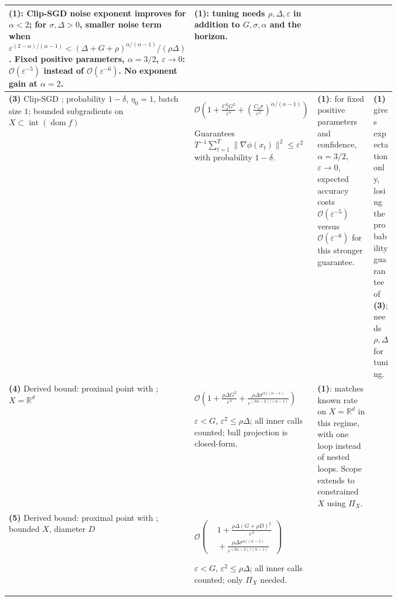 \begin{table}[tp]
\begin{threeparttable}
\begin{tabularx}{\linewidth}{@{}>{\raggedright\arraybackslash}p{0.20\linewidth}>{\raggedright\arraybackslash}p{0.32\linewidth}>{\raggedright\arraybackslash}p{0.25\linewidth}>{\raggedright\arraybackslash}X@{}}
\textbf{(1)}: Clip-SGD noise exponent improves for $\alpha<2$; for $\sigma,\Delta>0$, smaller noise term when $\varepsilon^{(2-\alpha)/(\alpha-1)}<(\Delta+G+\rho)^{\alpha/(\alpha-1)}/(\rho\Delta)$. Fixed positive parameters, $\alpha=3/2$, $\varepsilon\to0$: $\mathcal{O}(\varepsilon^{-5})$ instead of $\mathcal{O}(\varepsilon^{-6})$. No exponent gain at $\alpha=2$. &
\textbf{(1)}: tuning needs $\rho,\Delta,\varepsilon$ in addition to $G,\sigma,\alpha$ and the horizon. \\
\midrule
\textbf{(3)} Clip-SGD \citep[Thm.~3, Eq.~(22)]{wchZhu2025v1}; probability $1-\delta$, $\eta_0=1$, batch size $1$; bounded subgradients on $X\subset\operatorname{int}(\operatorname{dom}f)$ &
$\mathcal{O}\!\left(1+\frac{C_\delta^2G^2}{\varepsilon^4}+\left(\frac{C_\delta\sigma}{\varepsilon^2}\right)^{\!\alpha/(\alpha-1)}\right)$\par Guarantees $T^{-1}\sum_{t=1}^T\|\nabla\phi(x_t)\|^2\le\varepsilon^2$ with probability $1-\delta$. &
\textbf{(1)}: for fixed positive parameters and confidence, $\alpha=3/2$, $\varepsilon\to0$, expected accuracy costs $\mathcal{O}(\varepsilon^{-5})$ versus $\mathcal{O}(\varepsilon^{-6})$ for this stronger guarantee. &
\textbf{(1)} gives expectation only, losing the probability guarantee of \textbf{(3)}; needs $\rho,\Delta$ for tuning. \\
\midrule
\textbf{(4)} Derived bound: proximal point \citep[Sec.~3]{wchDavis2018v5} with \citep[Thm.~9]{wchLiu2023v3}; $X=\mathbb R^d$ &
$\mathcal{O}\!\left(1+\frac{\rho\Delta G^2}{\varepsilon^4}+\frac{\rho\Delta\sigma^{\alpha/(\alpha-1)}}{\varepsilon^{(3\alpha-2)/(\alpha-1)}}\right)$\par $\varepsilon<G$, $\varepsilon^2\le\rho\Delta$; all inner calls counted; ball projection is closed-form. &
\textbf{(1)}: matches known rate on $X=\mathbb R^d$ in this regime, with one loop instead of nested loops. Scope extends to constrained $X$ using $\Pi_X$. & \\
\midrule
\textbf{(5)} Derived bound: proximal point \citep[Sec.~3]{wchDavis2018v5} with \citep[Thm.~9]{wchLiu2023v3}; bounded $X$, diameter $D$ &
$\mathcal{O}\!\left(\begin{aligned}&1+\frac{\rho\Delta(G+\rho D)^2}{\varepsilon^4}\\&{}+\frac{\rho\Delta\sigma^{\alpha/(\alpha-1)}}{\varepsilon^{(3\alpha-2)/(\alpha-1)}}\end{aligned}\right)$\par $\varepsilon<G$, $\varepsilon^2\le\rho\Delta$; all inner calls counted; only $\Pi_X$ needed. &

\end{tabularx}
\end{threeparttable}
\end{table}
